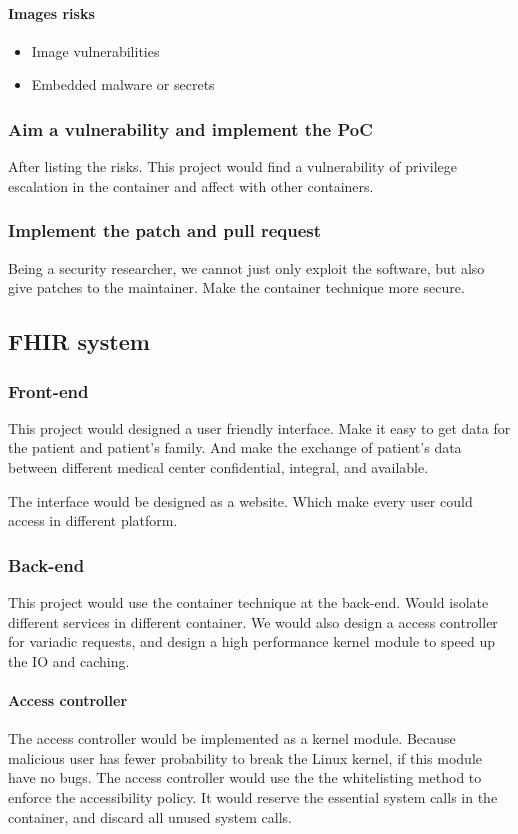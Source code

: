 \documentclass[12pt,a4paper]{IEEEconf}
\begin{document}
\paragraph{Images risks}
\begin{itemize}
  \item Image vulnerabilities
  \item Embedded malware or secrets
\end{itemize}

\subsubsection{Aim a vulnerability and implement the PoC}
After listing the risks. This project would find a vulnerability of privilege escalation in
the container and affect with other containers.

\subsubsection{Implement the patch and pull request}
Being a security researcher, we cannot just only exploit the software, but also give patches to
the maintainer. Make the container technique more secure.

\subsection{FHIR system}
\subsubsection{Front-end}
This project would designed a user friendly interface. Make it easy to get data for the
patient and patient's family. And make the exchange of patient's data between different medical
center confidential, integral, and available.

The interface would be designed as a website. Which make every user could access in different platform.

\subsubsection{Back-end}
This project would use the container technique at the back-end. Would isolate different services in
different container. We would also design a access controller for variadic requests, and
design a high performance kernel module to speed up the IO and caching.

\paragraph{Access controller}
The access controller would be implemented as a kernel module. Because malicious user has fewer
probability to break the Linux kernel, if this module have no bugs.
The access controller would use the the whitelisting method to enforce the accessibility policy.
It would reserve the essential system calls in the container, and discard all unused system calls.
\end{document}
